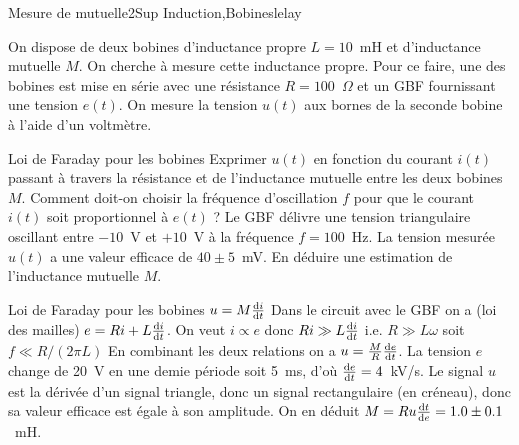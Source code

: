 \begin{exercise}{Mesure de mutuelle}{2}{Sup}
{Induction,Bobines}{lelay}

On dispose de deux bobines d'inductance propre $L = 10$~mH et d'inductance mutuelle $M$. On cherche à mesure cette inductance propre. Pour ce faire, une des bobines est mise en série avec une résistance $R = 100$~$\Omega$ et un GBF fournissant une tension $e(t)$. On mesure la tension $u(t)$ aux bornes de la seconde bobine à l'aide d'un  voltmètre.

\begin{questions}
    \questioncours Loi de Faraday pour les bobines
    \question Exprimer $u(t)$ en fonction du courant $i(t)$ passant à travers la résistance et de l'inductance mutuelle entre les deux bobines $M$.
    \question Comment doit-on choisir la fréquence d'oscillation $f$ pour que le courant $i(t)$ soit proportionnel à $e(t)$ ?
    \question Le GBF délivre une tension triangulaire oscillant entre $-10$~V et $+10$~V à la fréquence $f = 100$~Hz. La tension mesurée $u(t)$ a une valeur efficace de $40\pm 5$~mV. En déduire une estimation de l'inductance mutuelle $M$.
\end{questions}

\end{exercise}

\begin{solution}
    
\begin{questions}
    \questioncours Loi de Faraday pour les bobines
    \question $u = M\dv{i}{t}$
    \question Dans le circuit avec le GBF on a (loi des mailles) $e = Ri + L\dv{i}{t}$. On veut $i\propto e$ donc $R i \gg L\dv{i}{t}$ i.e. $R\gg L\omega$ soit $f \ll R/(2\pi L)$
    \question En combinant les deux relations on a $u = \frac{M}{R}\dv{e}{t}$. La tension $e$ change de 20~V en une demie période soit 5~ms, d'où $\dv{e}{t} = 4$~kV/s. Le signal $u$ est la dérivée d'un signal triangle, donc un signal rectangulaire (en créneau), donc sa valeur efficace est égale à son amplitude. On en déduit $M = Ru \dv{t}{e} = 1.0 \pm 0.1$~mH.
\end{questions}
\end{solution}
